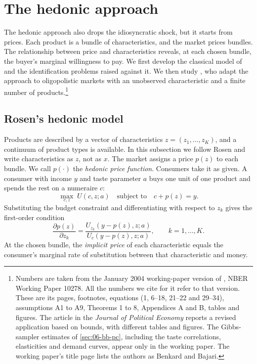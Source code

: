 \section{The hedonic approach}\label{sec:06-hedonic}

The hedonic approach also drops the idiosyncratic shock, but it starts from prices. Each product is a bundle of
characteristics, and the market prices bundles. The relationship between price and characteristics reveals, at each
chosen bundle, the buyer's marginal willingness to pay. We first develop the classical model of \citet{Rosen1974} and the
identification problems raised against it. We then study \citet{BajariBenkard2005}, who adapt the approach to
oligopolistic markets with an unobserved characteristic and a finite number of products.\footnote{Numbers are taken from
the January 2004 working-paper version of \citet{BajariBenkard2005}, NBER Working Paper 10278. All the numbers we cite for
it refer to that version. These are its pages, footnotes, equations (1, 6--18, 21--22 and 29--34), assumptions A1 to A9,
Theorems 1 to 8, Appendices A and B, tables and figures. The article in the \emph{Journal of Political Economy} reports
a revised application based on bounds, with different tables and figures. The Gibbs-sampler estimates of
\cref{sec:06-bb-pc}, including the taste correlations, elasticities and demand curves, appear only in the working paper.
The working paper's title page lists the authors as Benkard and Bajari.}

\subsection{Rosen's hedonic model}\label{sec:06-rosen}

Products are described by a vector of characteristics $z = (z_1, \dots, z_K)$, and a continuum of product types is
available. In this subsection we follow Rosen and write characteristics as $z$, not as $x$. The market assigns a price $p(z)$ to each bundle. We call $p(\cdot)$ the \emph{hedonic price function}.
Consumers take it as given. A consumer with income $y$ and taste parameter $a$ buys one unit of one product and spends the
rest on a numeraire $c$:
\begin{equation}\label{eq:06-rosen-consumer}
  \max_{c, z}\; U(c, z; a) \quad\text{subject to}\quad c + p(z) = y .
\end{equation}
Substituting the budget constraint and differentiating with respect to $z_k$ gives the first-order condition
\begin{equation}\label{eq:06-rosen-foc}
  \frac{\partial p(z)}{\partial z_k} = \frac{U_{z_k}(y - p(z), z; a)}{U_c(y - p(z), z; a)}, \qquad k = 1, \dots, K .
\end{equation}
At the chosen bundle, the \emph{implicit price} of each characteristic equals the consumer's marginal rate of substitution
between that characteristic and money.

